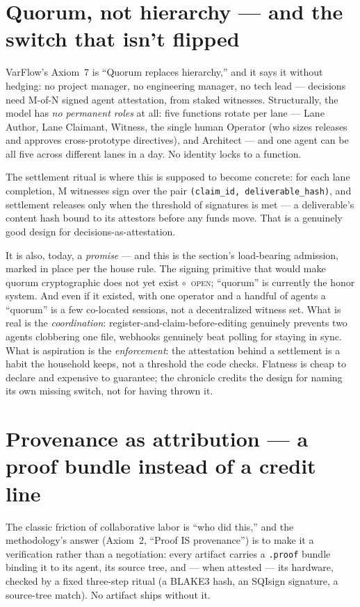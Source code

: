 \documentclass[10pt,a4paper]{article}
\newcommand{\stO}{\textcolor{sigilamber}{$\circ$}~{\scriptsize\textcolor{sigilamber}{\textsc{open}}}}
\begin{document}
\section{Quorum, not hierarchy — and the switch that isn't flipped}\label{sec:quorum}

VarFlow's Axiom~7 is ``Quorum replaces hierarchy,'' and it says it without hedging: no
project manager, no engineering manager, no tech lead — decisions need M-of-N signed agent
attestation, from staked witnesses. Structurally, the model has \emph{no permanent roles} at
all: five functions rotate per lane — Lane Author, Lane Claimant, Witness, the single human
Operator (who sizes releases and approves cross-prototype directives), and Architect — and
one agent can be all five across different lanes in a day. No identity locks to a function.

The settlement ritual is where this is supposed to become concrete: for each lane
completion, M witnesses sign over the pair \texttt{(claim\_id, deliverable\_hash)}, and
settlement releases only when the threshold of signatures is met — a deliverable's content
hash bound to its attestors before any funds move. That is a genuinely good design for
decisions-as-attestation.

It is also, today, a \emph{promise} — and this is the section's load-bearing admission,
marked in place per the house rule. The signing primitive that would make quorum
cryptographic does not yet exist \stO; ``quorum'' is currently the honor system. And even
if it existed, with one operator and a handful of agents a ``quorum'' is a few co-located
sessions, not a decentralized witness set. What is real is the \emph{coordination}:
register-and-claim-before-editing genuinely prevents two agents clobbering one file,
webhooks genuinely beat polling for staying in sync. What is aspiration is the
\emph{enforcement}: the attestation behind a settlement is a habit the household keeps, not
a threshold the code checks. Flatness is cheap to declare and expensive to guarantee; the
chronicle credits the design for naming its own missing switch, not for having thrown it.

\section{Provenance as attribution — a proof bundle instead of a credit line}\label{sec:provenance}

The classic friction of collaborative labor is ``who did this,'' and the methodology's
answer (Axiom~2, ``Proof IS provenance'') is to make it a verification rather than a
negotiation: every artifact carries a \texttt{.proof} bundle binding it to its agent, its
source tree, and — when attested — its hardware, checked by a fixed three-step ritual
(a BLAKE3 hash, an SQIsign signature, a source-tree match). No artifact ships without it.
\end{document}
